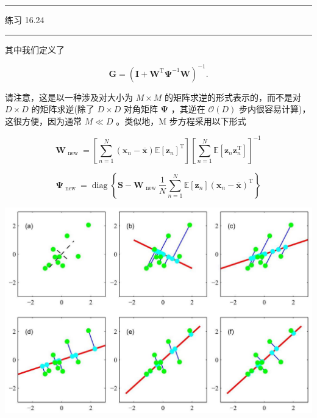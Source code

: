 \documentclass[10pt]{article}
\newcommand{\HRule}{\begin{center}\rule{0.9\linewidth}{0.2mm}\end{center}}
\begin{document}
\HRule

练习 16.24

\HRule

其中我们定义了

\[
\mathbf{G} = {\left( \mathbf{I} + {\mathbf{W}}^{\mathrm{T}}{\mathbf{\Psi }}^{-1}\mathbf{W}\right) }^{-1}. \tag{16.74}
\]

请注意，这是以一种涉及对大小为 \(M \times  M\) 的矩阵求逆的形式表示的，而不是对 \(D \times  D\) 的矩阵求逆(除了 \(D \times  D\) 对角矩阵 \(\mathbf{\Psi }\) ，其逆在 \(\mathcal{O}\left( D\right)\) 步内很容易计算)，这很方便，因为通常 \(M \ll  D\) 。类似地，M 步方程采用以下形式

\[
{\mathbf{W}}_{\text{ new }} = \left\lbrack  {\mathop{\sum }\limits_{{n = 1}}^{N}\left( {{\mathbf{x}}_{n} - \overline{\mathbf{x}}}\right) \mathbb{E}{\left\lbrack  {\mathbf{z}}_{n}\right\rbrack  }^{\mathrm{T}}}\right\rbrack  {\left\lbrack  \mathop{\sum }\limits_{{n = 1}}^{N}\mathbb{E}\left\lbrack  {\mathbf{z}}_{n}{\mathbf{z}}_{n}^{\mathrm{T}}\right\rbrack  \right\rbrack  }^{-1} \tag{16.75}
\]

\[
{\mathbf{\Psi }}_{\text{ new }} = \operatorname{diag}\left\{  {\mathbf{S} - {\mathbf{W}}_{\text{ new }}\frac{1}{N}\mathop{\sum }\limits_{{n = 1}}^{N}\mathbb{E}\left\lbrack  {\mathbf{z}}_{n}\right\rbrack  {\left( {\mathbf{x}}_{n} - \overline{\mathbf{x}}\right) }^{\mathrm{T}}}\right\}   \tag{16.76}
\]

\begin{center}
\includegraphics[max width=1.0\textwidth]{images/0194e279-9b28-703a-88f4-c3ac21e2010d_540_247_351_1304_872_0.jpg}
\end{center}
\hspace*{3em} 
\end{document}
